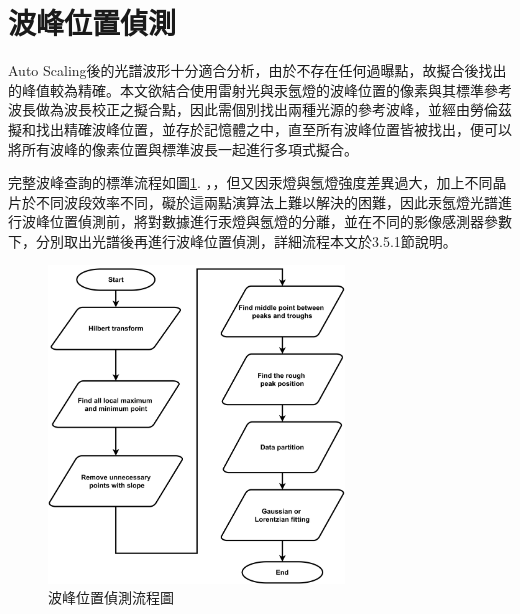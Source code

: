 \newpage
\section{波峰位置偵測}
Auto Scaling後的光譜波形十分適合分析，由於不存在任何過曝點，故擬合後找出的峰值較為精確。本文欲結合使用雷射光與汞氬燈的波峰位置的像素與其標準參考波長做為波長校正之擬合點，因此需個別找出兩種光源的參考波峰，並經由勞倫茲擬和找出精確波峰位置，並存於記憶體之中，直至所有波峰位置皆被找出，便可以將所有波峰的像素位置與標準波長一起進行多項式擬合。\par
完整波峰查詢的標準流程如圖\ref{波峰位置偵測流程圖}. ，，但又因汞燈與氬燈強度差異過大，加上不同晶片於不同波段效率不同，礙於這兩點演算法上難以解決的困難，因此汞氬燈光譜進行波峰位置偵測前，將對數據進行汞燈與氬燈的分離，並在不同的影像感測器參數下，分別取出光譜後再進行波峰位置偵測，詳細流程本文於3.5.1節說明。
\begin{figure}[H] %
	\centering %
	\vspace{0.8cm}
	\setlength{\abovecaptionskip}{0.8cm}
	\includegraphics[width=0.7\textwidth]{figures/FINDPEAK_FLOWCHART.png} %
	\caption{波峰位置偵測流程圖} %
	\label{波峰位置偵測流程圖} %
\end{figure}

